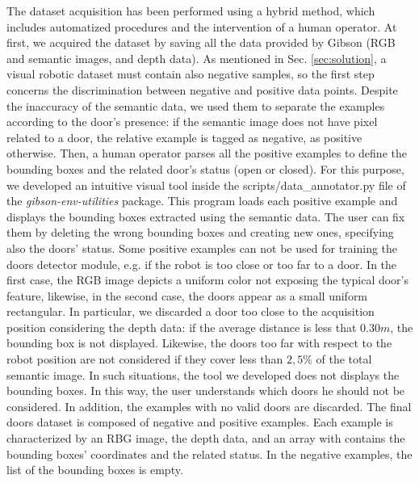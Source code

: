 The dataset acquisition has been performed using a hybrid method, which includes automatized procedures and the intervention of a human operator. At first, we acquired the dataset by saving all the data provided by Gibson (RGB and semantic images, and depth data). As mentioned in Sec. \ref{sec:solution}, a visual robotic dataset must contain also negative samples, so the first step concerns the discrimination between negative and positive data points. Despite the inaccuracy of the semantic data, we used them to separate the examples according to the door's presence: if the semantic image does not have pixel related to a door, the relative example is tagged as negative, as positive otherwise. Then, a human operator parses all the positive examples to define the bounding boxes and the related door's status (open or closed). For this purpose, we developed an intuitive visual tool inside the \textsf{scripts/data\_annotator.py} file of the \textit{gibson-env-utilities} package. This program loads each positive example and displays the bounding boxes extracted using the semantic data. The user can fix them by deleting the wrong bounding boxes and creating new ones, specifying also the doors' status. Some positive examples can not be used for training the doors detector module, e.g. if the robot is too close or too far to a door. In the first case, the RGB image depicts a uniform color not exposing the typical door's feature, likewise, in the second case, the doors appear as a small uniform rectangular. In particular, we discarded a door too close to the acquisition position considering the depth data: if the average distance is less that $0.30 m$, the bounding box is not displayed. Likewise, the doors too far with respect to the robot position are not considered if they cover less than $2,5\%$ of the total semantic image. In such situations, the tool we developed does not displays the bounding boxes. In this way, the user understands which doors he should not be considered. In addition, the examples with no valid doors are discarded. The final doors dataset is composed of negative and positive examples. Each example is characterized by an RBG image, the depth data, and an array with contains the bounding boxes' coordinates and the related status. In the negative examples, the list of the bounding boxes is empty.


